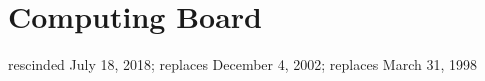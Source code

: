 \section{Computing Board}
rescinded July 18, 2018; replaces December 4, 2002; replaces March 31, 1998
